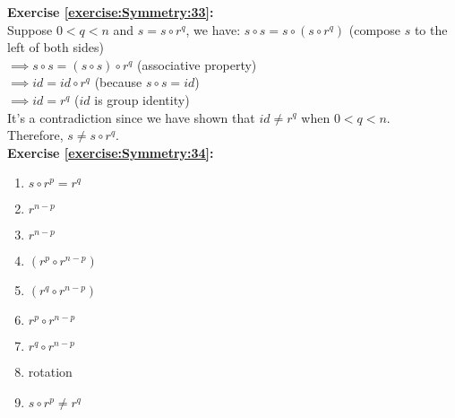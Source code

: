 \noindent\textbf{Exercise \ref{exercise:Symmetry:33}:}\\
%
Suppose $0<q<n$ and $s=s\circ r^q$, we have:
$s\circ s=s\circ(s\circ r^q)$ (compose $s$ to the left of both sides)\\
$\implies s\circ s=(s\circ s)\circ r^q$ (associative property)\\
$\implies id=id\circ r^q$ (because $s\circ s=id$)\\
$\implies id=r^q$ ($id$ is group identity)\\
It's a contradiction since we have shown that $id\neq r^q$ when $0<q<n$.\\
Therefore, $s\neq s\circ r^q$.\\

\noindent\textbf{Exercise \ref{exercise:Symmetry:34}:}
\begin{multicols}{3}
\begin{enumerate}
\item
$s\circ r^p=r^q$

\item
$r^{n-p}$

\item
$r^{n-p}$

\item
$(r^p\circ r^{n-p})$

\item
$(r^q\circ r^{n-p})$

\item
$r^p\circ r^{n-p}$

\item
$r^q\circ r^{n-p}$

\item
rotation

\item
$s\circ r^p\neq r^q$
\end{enumerate}
\end{multicols}

